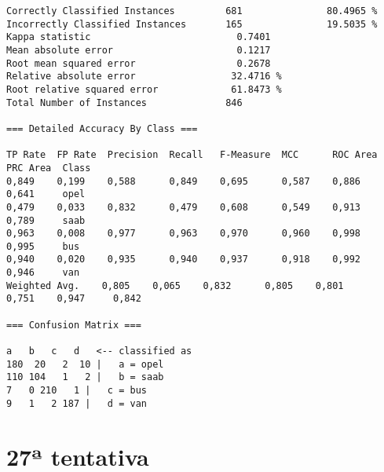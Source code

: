 \documentclass[
	article,			%
	11pt,				%
	oneside,			%
	a4paper,			%
	english,			%
	brazil,				%
	sumario=tradicional
	]{abntex2}
\begin{document}
\begin{lstlisting}
Correctly Classified Instances         681               80.4965 %
Incorrectly Classified Instances       165               19.5035 %
Kappa statistic                          0.7401
Mean absolute error                      0.1217
Root mean squared error                  0.2678
Relative absolute error                 32.4716 %
Root relative squared error             61.8473 %
Total Number of Instances              846     

=== Detailed Accuracy By Class ===

TP Rate  FP Rate  Precision  Recall   F-Measure  MCC      ROC Area  PRC Area  Class
0,849    0,199    0,588      0,849    0,695      0,587    0,886     0,641     opel
0,479    0,033    0,832      0,479    0,608      0,549    0,913     0,789     saab
0,963    0,008    0,977      0,963    0,970      0,960    0,998     0,995     bus
0,940    0,020    0,935      0,940    0,937      0,918    0,992     0,946     van
Weighted Avg.    0,805    0,065    0,832      0,805    0,801      0,751    0,947     0,842     

=== Confusion Matrix ===

a   b   c   d   <-- classified as
180  20   2  10 |   a = opel
110 104   1   2 |   b = saab
7   0 210   1 |   c = bus
9   1   2 187 |   d = van

\end{lstlisting}

\newpage

\section{27ª tentativa}
\end{document}

